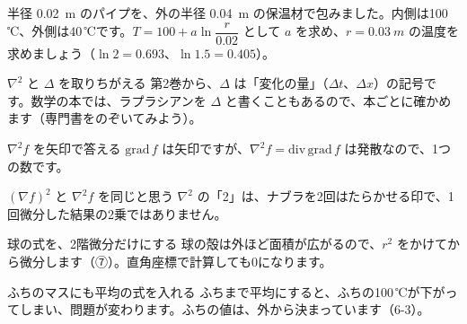 \begin{jibun}
半径 \qty{0.02}{m} のパイプを、外の半径 \qty{0.04}{m} の保温材で包みました。内側は100\,℃、外側は40\,℃です。$T=100+a\ln\dfrac{r}{0.02}$ として $a$ を求め、$r=\qty{0.03}{m}$ の温度を求めましょう（$\ln2=0.693$、$\ln1.5=0.405$）。
\end{jibun}


\begin{tsumazuki}{$\nabla^2$ と $\Delta$ を取りちがえる}
第2巻から、$\Delta$ は「変化の量」（$\Delta t$、$\Delta x$）の記号です。数学の本では、ラプラシアンを $\Delta$ と書くこともあるので、本ごとに確かめます（専門書をのぞいてみよう）。
\end{tsumazuki}

\begin{tsumazuki}{$\nabla^2f$ を矢印で答える}
$\mathrm{grad}\,f$ は矢印ですが、$\nabla^2f=\mathrm{div}\,\mathrm{grad}\,f$ は発散なので、1つの数です。
\end{tsumazuki}

\begin{tsumazuki}{$(\nabla f)^2$ と $\nabla^2f$ を同じと思う}
$\nabla^2$ の「2」は、ナブラを2回はたらかせる印で、1回微分した結果の2乗ではありません。
\end{tsumazuki}

\begin{tsumazuki}{球の式を、2階微分だけにする}
球の殻は外ほど面積が広がるので、$r^2$ をかけてから微分します（⑦）。直角座標で計算しても0になります。
\end{tsumazuki}

\begin{tsumazuki}{ふちのマスにも平均の式を入れる}
ふちまで平均にすると、ふちの100\,℃が下がってしまい、問題が変わります。ふちの値は、外から決まっています（6-3）。
\end{tsumazuki}

